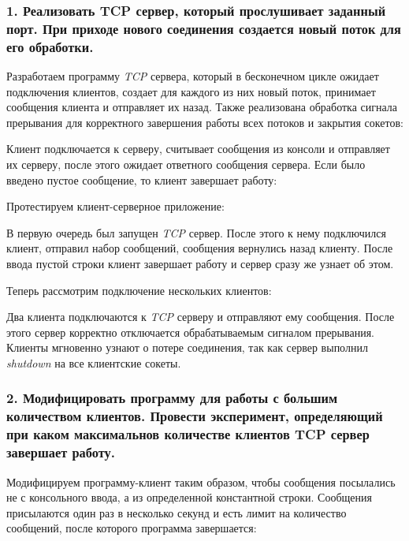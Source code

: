 \documentclass[14pt,a4paper,report]{report}
\begin{document}


\subsubsection{1. Реализовать TCP сервер, который прослушивает заданный порт. При приходе нового соединения создается новый поток для его обработки.}

Разработаем программу \emph{TCP} сервера, который в бесконечном цикле ожидает подключения клиентов, создает для каждого из них новый поток, принимает сообщения клиента и отправляет их назад. Также реализована обработка сигнала прерывания для корректного завершения работы всех потоков и закрытия сокетов:



Клиент подключается к серверу, считывает сообщения из консоли и отправляет их серверу, после этого ожидает ответного сообщения сервера. Если было введено пустое сообщение, то клиент завершает работу:



Протестируем клиент-серверное приложение:




В первую очередь был запущен \emph{TCP} сервер. После этого к нему подключился клиент, отправил набор сообщений, сообщения вернулись назад клиенту. После ввода пустой строки клиент завершает работу и сервер сразу же узнает об этом.

Теперь рассмотрим подключение нескольких клиентов:




Два клиента подключаются к \emph{TCP} серверу и отправляют ему сообщения. После этого сервер корректно отключается обрабатываемым сигналом прерывания. Клиенты мгновенно узнают о потере соединения, так как сервер выполнил \emph{shutdown} на все клиентские сокеты.

\subsubsection{2. Модифицировать программу для работы с большим количеством клиентов. Провести эксперимент, определяющий при каком максимальнов количестве клиентов TCP сервер завершает работу.}

Модифицируем программу-клиент таким образом, чтобы сообщения посылались не с консольного ввода, а из определенной константной строки. Сообщения присылаются один раз в несколько секунд и есть лимит на количество сообщений, после которого программа завершается:
\end{document}
